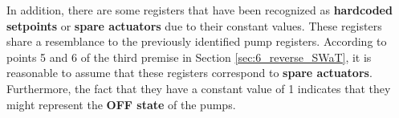 \bigskip
In addition, there are some registers that have been recognized as \textbf{hardcoded setpoints} or \textbf{spare actuators} due to their constant values. These registers share a resemblance to the previously identified pump registers. According to points 5 and 6 of the third premise in Section \ref{sec:6_reverse_SWaT}, it is reasonable to assume that these registers correspond to \textbf{spare actuators}. Furthermore, the fact that they have a constant value of 1 indicates that they might represent the \textbf{OFF state} of the pumps.


		
		
		
		
		
		
